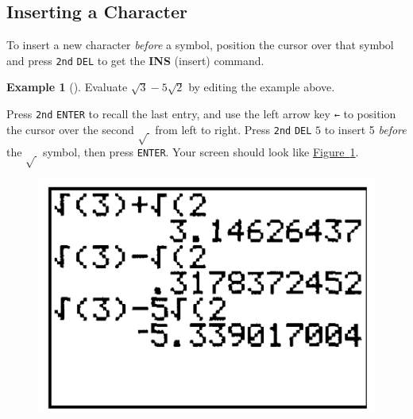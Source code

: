 \documentclass[10pt,]{book}
\newcommand{\terminology}[1]{\textbf{#1}}
\theoremstyle{plain}
\theoremstyle{definition}
\theoremstyle{definition}
\newtheorem{example}[theorem]{Example}
\theoremstyle{definition}
\numberwithin{equation}{part}
\begin{document}
\subsection[{Inserting a Character}]{Inserting a Character}\label{subsection-74}
To insert a new character \emph{before} a symbol, position the cursor over that symbol and press \lstinline?2nd? \lstinline?DEL? to get the \terminology{INS} (insert) command.%
\begin{example}[]\label{example-113}
Evaluate \(\sqrt{3}-5\sqrt{2} \) by editing the example above.%
\par
Press  \lstinline?2nd? \lstinline?ENTER?  to recall the last entry, and use the left arrow key \lstinline?←? to position the cursor over the second \(\sqrt{\,}\) from left to right. Press \lstinline?2nd? \lstinline?DEL?  \(5\) to insert 5 \emph{before} the \(\sqrt{\,}\) symbol, then press \lstinline?ENTER?. Your screen should look like \hyperref[fig-GC-sum-of-roots2]{Figure~\ref{fig-GC-sum-of-roots2}}. \leavevmode%
\begin{figure}
\centering
\includegraphics[width=0.25\linewidth]{images/fig-GC-sum-of-roots2.jpg}
\caption{\label{fig-GC-sum-of-roots2}}
\end{figure}
%
\end{example}
\typeout{************************************************}
\typeout{************************************************}
\end{document}
